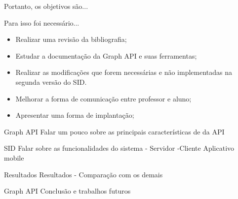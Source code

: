 \documentclass{aula-ifb}
\begin{document}
\begin{frame}{Portanto, os objetivos são...}

\end{frame}

\begin{frame}{Para isso foi necessário...}
\begin{itemize}
   \item Realizar uma revisão da bibliografia;
   \vspace{10px	}
   \item Estudar a documentação da Graph API e suas ferramentas;
   \vspace{10px}
   \item Realizar as modificações que forem necessárias e não implementadas na segunda versão do SID.
   \vspace{10px}
   \item Melhorar a forma de comunicação entre professor e aluno;
   \vspace{10px}
   \item Apresentar uma forma de implantação;
\end{itemize}
\end{frame}


\begin{frame}{Graph API}
Falar um pouco sobre as principais características de da API
\end{frame}

\begin{frame}{SID}
Falar sobre as funcionalidades do sistema
- Servidor
-Cliente
Aplicativo mobile
\end{frame}

\begin{frame}{Resultados}
Resultados - Comparação com os demais
\end{frame}

\begin{frame}{Graph API}
Conclusão e trabalhos futuros
\end{frame}
\end{document}
